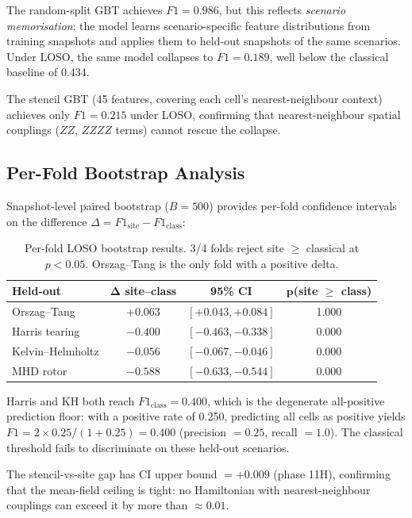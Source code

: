 \documentclass[12pt, a4paper, oneside]{report}
\begin{document}
The random-split GBT achieves $F1 = 0.986$, but this reflects \textit{scenario memorisation}: the model learns scenario-specific feature distributions from training snapshots and applies them to held-out snapshots of the same scenarios. Under LOSO, the same model collapses to $F1 = 0.189$, well below the classical baseline of 0.434.

The stencil GBT (45 features, covering each cell's nearest-neighbour context) achieves only $F1 = 0.215$ under LOSO, confirming that nearest-neighbour spatial couplings ($ZZ$, $ZZZZ$ terms) cannot rescue the collapse.

\subsection{Per-Fold Bootstrap Analysis}

Snapshot-level paired bootstrap ($B = 500$) provides per-fold confidence intervals on the difference $\Delta = F1_\text{site} - F1_\text{class}$:

\begin{table}[H]
\centering
\caption{Per-fold LOSO bootstrap results. 3/4 folds reject site $\geq$ classical at $p < 0.05$. Orszag--Tang is the only fold with a positive delta.}
\label{tab:loso-bootstrap}
\begin{tabular}{lccc}
\toprule
\textbf{Held-out} & $\bm{\Delta}$ \textbf{site--class} & \textbf{95\% CI} & $\bm{p}$\textbf{(site} $\geq$ \textbf{class)} \\
\midrule
Orszag--Tang & $+0.063$ & $[+0.043, +0.084]$ & 1.000 \\
Harris tearing & $-0.400$ & $[-0.463, -0.338]$ & 0.000 \\
Kelvin--Helmholtz & $-0.056$ & $[-0.067, -0.046]$ & 0.000 \\
MHD rotor & $-0.588$ & $[-0.633, -0.544]$ & 0.000 \\
\bottomrule
\end{tabular}
\end{table}

Harris and KH both reach $F1_\text{class} = 0.400$, which is the degenerate all-positive prediction floor: with a positive rate of 0.250, predicting all cells as positive yields $F1 = 2 \times 0.25 / (1 + 0.25) = 0.400$ (precision $= 0.25$, recall $= 1.0$). The classical threshold fails to discriminate on these held-out scenarios.

The stencil-vs-site gap has CI upper bound $= +0.009$ (phase 11H), confirming that the mean-field ceiling is tight: no Hamiltonian with nearest-neighbour couplings can exceed it by more than $\approx 0.01$.
\end{document}
